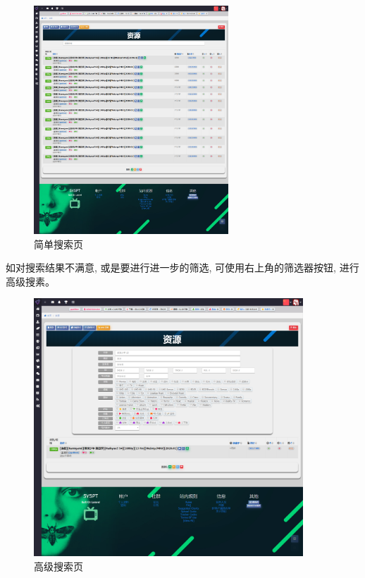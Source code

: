 \begin{figure}[h]
    \centering
    \includegraphics[width=0.65\textwidth]{support-files/5.2-search-page-1.png}
    \caption{简单搜索页}
    \label{fig:websearchpage1}
\end{figure}

如对搜索结果不满意, 或是要进行进一步的筛选, 可使用右上角的筛选器按钮, 进行高级搜素。

\begin{figure}[h]
    \centering
    \includegraphics[width=0.9\textwidth]{support-files/5.2-search-page-2.png}
    \caption{高级搜索页}
    \label{fig:websearchpage2}
\end{figure}

